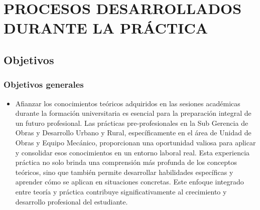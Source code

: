 \chapter{PROCESOS DESARROLLADOS DURANTE LA PRÁCTICA}\label{procesos-desarrollados}
\section{Objetivos}
\subsection{Objetivos generales}
\begin{itemize}
	\item Afianzar los conocimientos teóricos adquiridos en las sesiones académicas durante la formación universitaria es esencial para la preparación integral de un futuro profesional. Las prácticas pre-profesionales en la Sub Gerencia de Obras y Desarrollo Urbano y Rural, específicamente en el área de Unidad de Obras y Equipo Mecánico, proporcionan una oportunidad valiosa para aplicar y consolidar esos conocimientos en un entorno laboral real. Esta experiencia práctica no solo brinda una comprensión más profunda de los conceptos teóricos, sino que también permite desarrollar habilidades específicas y aprender cómo se aplican en situaciones concretas. Este enfoque integrado entre teoría y práctica contribuye significativamente al crecimiento y desarrollo profesional del estudiante.

\end{itemize}
